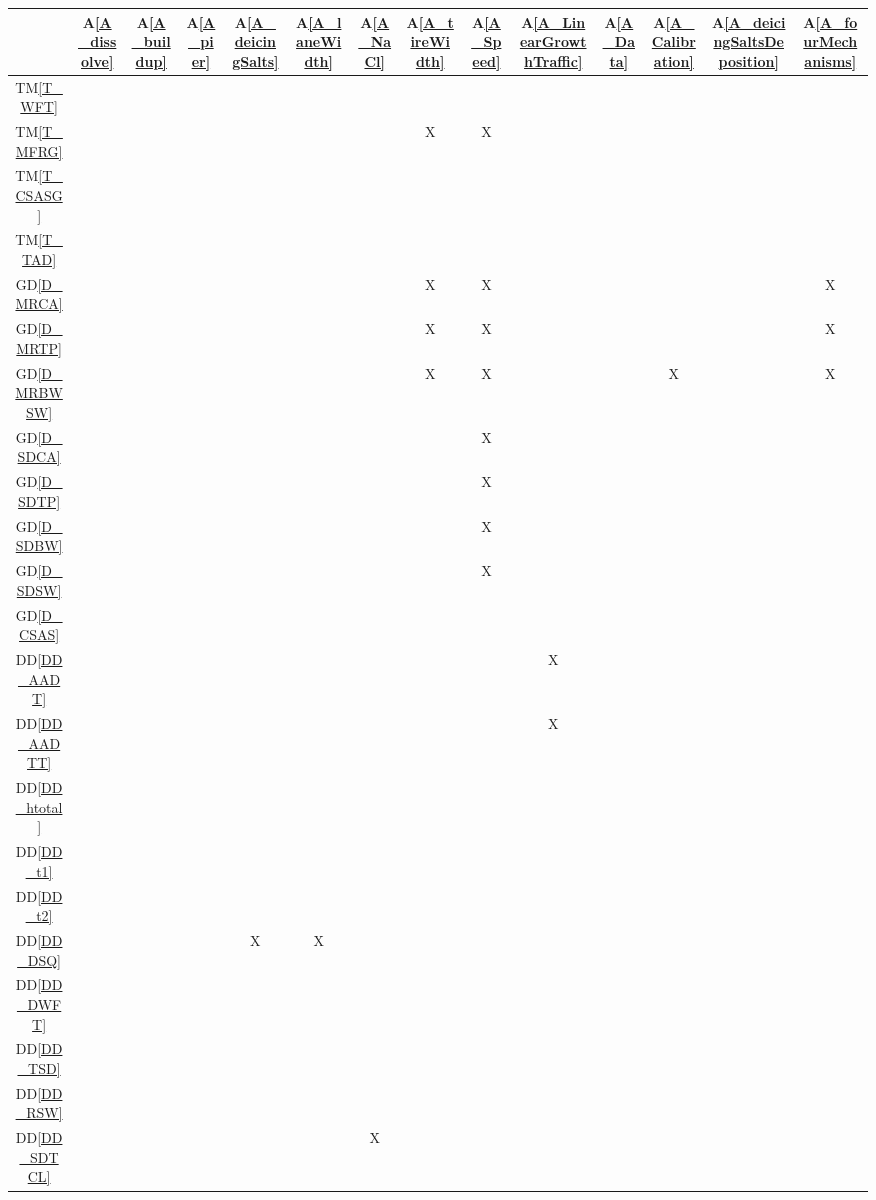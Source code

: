 \documentclass[12pt]{article}
\newcommand{\dref}[1]{GD\ref{#1}}
\newcommand{\ddref}[1]{DD\ref{#1}}
\newcommand{\tref}[1]{TM\ref{#1}}
\newcommand{\aref}[1]{A\ref{#1}}
\begin{document}
\noindent
\begin{table}[H]
\centering
\begin{tabular}{|c|c|c|c|c|c|c|c|c|c|c|c|c|c|}
\hline
	& \aref{A_dissolve} & \aref{A_buildup} & \aref{A_pier} & \aref{A_deicingSalts}& \aref{A_laneWidth}& \aref{A_NaCl} & \aref{A_tireWidth} & \aref{A_Speed} & \aref{A_LinearGrowthTraffic} & \aref{A_Data} & \aref{A_Calibration} & \aref{A_deicingSaltsDeposition} &\aref{A_fourMechanisms}\\
\hline
\tref{T_WFT}       & & & & & & & & &  & & & &  \\ \hline
\tref{T_MFRG}      & & & & & & & X & X & &  & & & \\ \hline
\tref{T_CSASG}        & & & & & & & &  & &  & & &\\ \hline
\tref{T_TAD}        & & &  & & && &  & & && &\\ \hline
\dref{D_MRCA}          & & & & & & & X & X  & &  & & &X \\ \hline
\dref{D_MRTP}          & &  & & && & X & X  & &  & & &X \\ \hline
\dref{D_MRBWSW}          & & & & & & & X & X  & &  & X  & &X\\ \hline
\dref{D_SDCA}            & &  & & && & & X  & &  & & & \\ \hline
\dref{D_SDTP}            & &  & & && & & X  & &  & & & \\ \hline
\dref{D_SDBW}            & &  & & && & & X  & &  && &  \\ \hline
\dref{D_SDSW}            & & & & & & & & X  & &  && &  \\ \hline
\dref{D_CSAS}       & & & & & & & &  & & && & \\ \hline
\ddref{DD_AADT}  & & & & & & & & & X &  && & \\ \hline
\ddref{DD_AADTT}  & & &  & & && &  & X & & & &\\ \hline
\ddref{DD_htotal}  & & &  & & && & & &  && & \\ \hline
\ddref{DD_t1}  & & & &  & & && &  & && & \\ \hline
\ddref{DD_t2}  & & & &  & & && &  & & & &\\ \hline
\ddref{DD_DSQ}    & & && X & X & &   &  & & & & & \\ \hline
\ddref{DD_DWFT}    & &  & & && & & &  & && &\\ \hline
\ddref{DD_TSD}    & &  & & && & & & &  && & \\ \hline
\ddref{DD_RSW}    & & & & & & & & & &  && & \\ \hline
\ddref{DD_SDTCL}    &  & & && & X &  & & & && &\\ \hline

\end{tabular}
\end{table}
\end{document}
